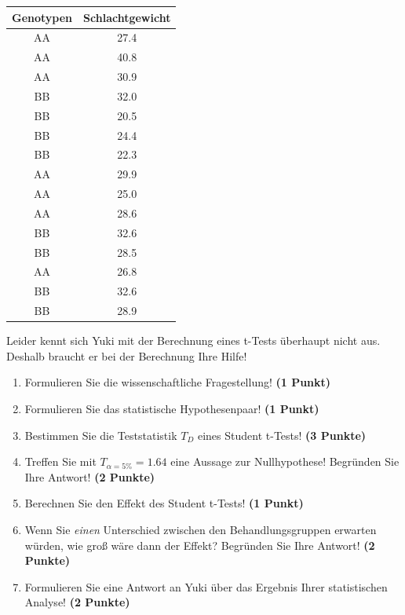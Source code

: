 \documentclass[a4paper, 9pt]{scrartcl}\usepackage[]{graphicx}\usepackage[]{xcolor}
\begin{document}
\begin{table}[!h]
\centering
\begin{tabular}{cc}
\toprule
Genotypen & Schlachtgewicht\\
\midrule
AA & 27.4\\
AA & 40.8\\
AA & 30.9\\
BB & 32.0\\
BB & 20.5\\
\addlinespace
BB & 24.4\\
BB & 22.3\\
AA & 29.9\\
AA & 25.0\\
AA & 28.6\\
\addlinespace
BB & 32.6\\
BB & 28.5\\
AA & 26.8\\
BB & 32.6\\
BB & 28.9\\
\bottomrule
\end{tabular}
\end{table}



Leider kennt sich Yuki mit der Berechnung eines t-Tests überhaupt nicht aus. Deshalb braucht er bei der Berechnung Ihre Hilfe!

\begin{enumerate}
  \item Formulieren Sie die wissenschaftliche Fragestellung! \textbf{(1 Punkt)}
  \item Formulieren Sie das statistische Hypothesenpaar! \textbf{(1 Punkt)}
  \item Bestimmen Sie die Teststatistik $T_{D}$ eines Student t-Tests! \textbf{(3 Punkte)}
\item Treffen Sie mit $T_{\alpha = 5\%} = 1.64$ eine Aussage zur Nullhypothese! Begründen Sie Ihre Antwort! \textbf{(2 Punkte)}
\item Berechnen Sie den Effekt des Student t-Tests! \textbf{(1 Punkt)}
\item Wenn Sie \textit{einen} Unterschied zwischen den Behandlungsgruppen erwarten würden, wie groß wäre dann der Effekt? Begründen Sie Ihre Antwort! \textbf{(2 Punkte)}
\item Formulieren Sie eine Antwort an Yuki über das Ergebnis Ihrer statistischen Analyse! \textbf{(2 Punkte)}
\end{enumerate} 
\clearpage
\end{document}
